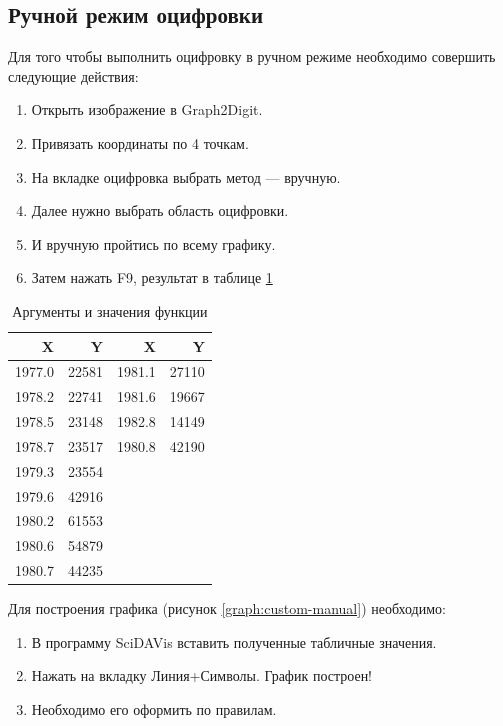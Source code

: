 \documentclass[a4paper,14pt,russian]{report}
\begin{document}
\subsection{Ручной режим оцифровки}

Для того чтобы выполнить оцифровку в ручном режиме необходимо совершить следующие действия:

\begin{enumerate}
  \item Открыть изображение в Graph2Digit.
  \item Привязать координаты по 4 точкам.
  \item На вкладке оцифровка выбрать метод — вручную.
  \item Далее нужно выбрать область оцифровки.
  \item И вручную пройтись по всему графику.
  \item Затем нажать F9, результат в таблице \ref{table:custom-manual}
\end{enumerate}

\begin{table}[!htb]
  \centering
  \caption{Аргументы и значения функции}
  \label{table:custom-manual}
  \begin{tabular}{|r|r|r|r|}
    \hline
    X & Y & X & Y \\
    \hline
    1977.0 & 22581 & 1981.1 & 27110 \\
    1978.2 & 22741 & 1981.6 & 19667 \\
    1978.5 & 23148 & 1982.8 & 14149 \\
    1978.7 & 23517 & 1980.8 & 42190 \\
    1979.3 & 23554 & & \\
    1979.6 & 42916 & & \\
    1980.2 & 61553 & & \\
    1980.6 & 54879 & & \\
    1980.7 & 44235 & & \\
    \hline
  \end{tabular}
\end{table}

Для построения графика (рисунок \ref{graph:custom-manual}) необходимо:

\begin{enumerate}
  \item В программу SciDAVis вставить полученные табличные значения.
  \item Нажать на вкладку Линия+Символы. График построен!
  \item Необходимо его оформить по правилам.
\end{enumerate}
\end{document}
